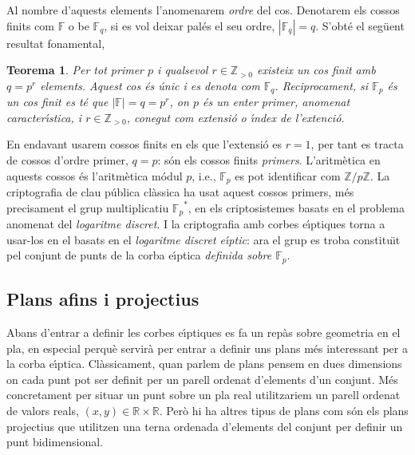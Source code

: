 \documentclass[12pt,twoside,catalan,a4paper]{book}%
\newtheorem{thm}{Teorema}%
\numberwithin{figure}{section}		%
\theoremstyle{definition}   			%
\def\ce{corba e\lgem{}\'{\i}ptica}%
\def\ces{corbes e\lgem{}\'{\i}ptiques}%
\def\cf{cos finit}%
\def\cfs{cossos finits}%
\def\ecdlp{logaritme discret e\lgem{}\'{\i}ptic}%
\newcommand{\F}{\ensuremath{\mathbb{F}}}%
\newcommand{\Fp}{\ensuremath{\mathbb{F}_p}}%
\newcommand{\Fq}{\ensuremath{\mathbb{F}_q}}%
\theoremstyle{saltolinea}   			%
\begin{document}
Al nombre d'aquests elements l'anomenarem \emph{ordre} del cos. Denotarem els \cfs{} com $\F$ o be $\Fq$, si es vol deixar pal\'es el seu ordre, $\left|\Fq\right|=q$. S'obt\'e el seg\"uent resultat fonamental,
\begin{thm}  Per tot primer $p$ i qualsevol $r\in\mathbb{Z}_{>0}$ existeix un \cf{} amb $q = p^r$ elements. Aquest cos \'es \'unic i es denota com \Fq. Reciprocament, si $\Fp$ \'es un \cf{} es t\'e que $\left|\F\right|=q=p^r$, on $p$ \'es un enter primer, anomenat \emph{caracter\'{\i}stica}, i $r\in\mathbb{Z}_{>0}$, conegut com \emph{extensi\'o} o \emph{\'{\i}ndex de l'extenci\'o}.\end{thm}

En endavant usarem \cfs{} en els que l'extensi\'o es $r=1$, per tant es tracta de cossos d'ordre primer, $q=p$: s\'on els \cfs{} \emph{primers}. L'aritm\`etica en aquests cossos \'es l'aritm\`etica m\'odul $p$, i.e., $\Fp$ es pot identificar com $\mathbb{Z}/p\mathbb{Z}$. La criptografia de clau p\'ublica cl\`assica ha usat aquest cossos primers, m\'es precisament el grup multiplicatiu $\Fp^*$, en els criptosistemes basats en el problema anomenat del \emph{logaritme discret}. I la criptografia amb \ces{} torna a usar-los en el basats en el \emph{\ecdlp{}}: ara el grup es troba constitu\"{\i}t pel conjunt de punts de la \ce{} \emph{definida sobre $\Fp$}.


\subsection{Plans afins i projectius}\label{sec:plans}
Abans d'entrar a definir les \ces{} es fa un rep\`as sobre geometria en el pla, en especial perqu\`e servir\`a per entrar a definir uns plans m\'es interessant per a la \ce{}. Cl\`assicament, quan parlem de plans pensem en dues dimensions on cada punt pot ser definit per un parell ordenat d'elements d'un conjunt. M\'es concretament per situar un punt sobre un pla real utilitzariem un parell ordenat de valors reals, $(x,y)\in\mathbb{R}\times\mathbb{R}$. Per\`o hi ha altres tipus de plans com s\'on els plans projectius que utilitzen una terna ordenada d'elements del conjunt per definir un punt bidimensional.
\end{document}

